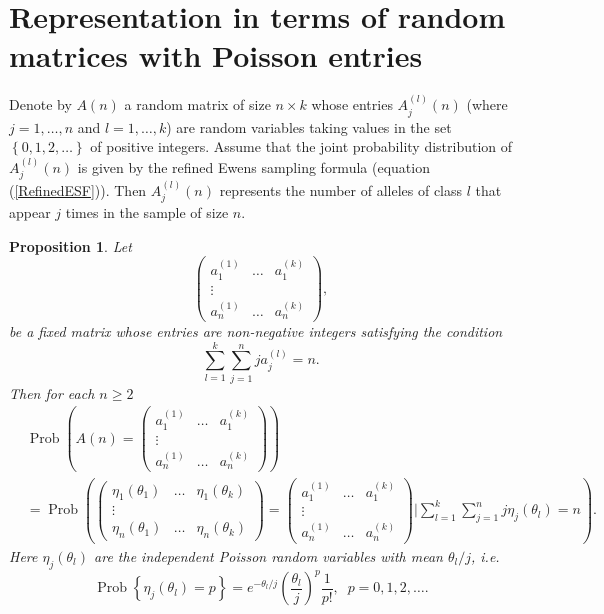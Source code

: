 \documentclass[12pt]{amsart}
\newtheorem{prop}[thm]{Proposition}
\theoremstyle{definition}
\numberwithin{equation}{section}
\DeclareMathOperator{\Prob}{Prob}
\begin{document}
\section{Representation in terms of random matrices with
Poisson entries}\label{SectionRepresentationPoisson}
Denote by $A(n)$ a random matrix of size $n\times k$ whose entries
$A_j^{(l)}(n)$ (where $j=1,\ldots, n$ and $l=1,\ldots,k$)
are random variables taking values in the set $\left\{0,1,2,\ldots\right\}$
of positive integers. Assume that the joint probability distribution
of $A_j^{(l)}(n)$ is given by the refined Ewens sampling formula
(equation (\ref{RefinedESF})). Then $A_j^{(l)}(n)$ represents the number
of alleles of class $l$ that appear $j$ times in the sample of size $n$.
\begin{prop}\label{PROPOSITION9.4}
Let
\begin{equation}\label{Data999}
\left(
\begin{array}{ccc}
  a_1^{(1)} & \ldots & a_1^{(k)} \\
  \vdots &  &  \\
  a_n^{(1)} & \ldots & a_n^{(k)}
\end{array}
\right),
\end{equation}
be a fixed matrix whose entries are non-negative integers satisfying the condition
\begin{equation}\label{NormalizationEntries}
\sum\limits_{l=1}^k\sum\limits_{j=1}^nja_j^{(l)}=n.
\end{equation}
Then for each $n\geq 2$
\begin{equation}
\begin{split}
&\Prob\left(A(n)=\left(
\begin{array}{ccc}
  a_1^{(1)} & \ldots & a_1^{(k)} \\
  \vdots &  &  \\
  a_n^{(1)} & \ldots & a_n^{(k)}
\end{array}
\right)\right)\\
&=\Prob\left(
\left(\begin{array}{ccc}
  \eta_1(\theta_1) &  \ldots & \eta_1(\theta_k) \\
  \vdots &  &  \\
  \eta_n(\theta_1) & \ldots & \eta_n(\theta_k)
\end{array}
\right)=\left(
\begin{array}{ccc}
  a_1^{(1)} & \ldots & a_1^{(k)} \\
  \vdots &  &  \\
  a_n^{(1)} & \ldots & a_n^{(k)}
\end{array}
\right)\biggl\vert\sum\limits_{l=1}^k\sum\limits_{j=1}^{n}j\eta_j(\theta_l)=n\right).
\end{split}
\end{equation}
Here $\eta_j(\theta_l)$ are the independent Poisson random variables with mean $\theta_l/j$, i.e.
\begin{equation}\label{9.4.0}
\Prob\left\{\eta_j(\theta_l)=p\right\}=e^{-\theta_l/j}\left(\frac{\theta_l}{j}\right)^p\frac{1}{p!},\;\; p=0,1,2,\ldots .
\end{equation}
\end{prop}
\end{document}
